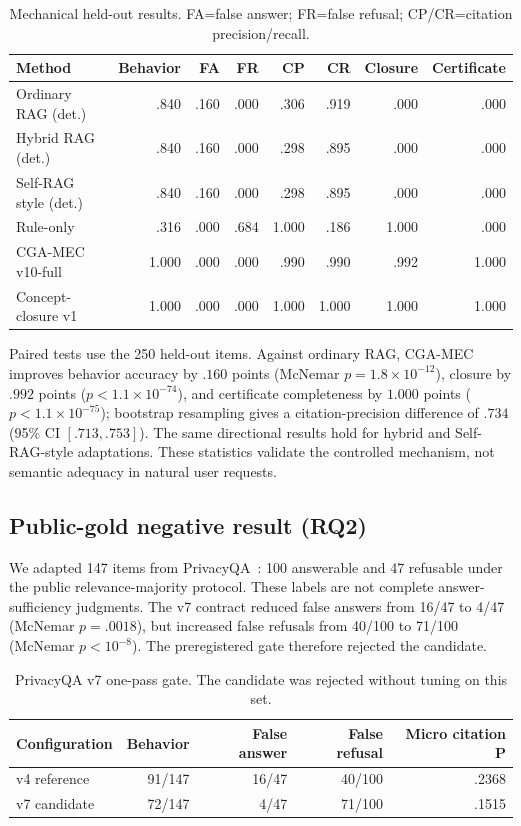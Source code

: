\documentclass[11pt]{article}
\newcommand{\method}{CGA-MEC}
\begin{document}
\begin{table}[t]
\centering
\caption{Mechanical held-out results. FA=false answer; FR=false refusal; CP/CR=citation precision/recall.}
\label{tab:mechanical}
\small
\begin{tabular}{@{}lrrrrrrr@{}}
\toprule
Method & Behavior & FA & FR & CP & CR & Closure & Certificate \\
\midrule
Ordinary RAG (det.) & .840 & .160 & .000 & .306 & .919 & .000 & .000 \\
Hybrid RAG (det.) & .840 & .160 & .000 & .298 & .895 & .000 & .000 \\
Self-RAG style (det.) & .840 & .160 & .000 & .298 & .895 & .000 & .000 \\
Rule-only & .316 & .000 & .684 & 1.000 & .186 & 1.000 & .000 \\
\method{} v10-full & 1.000 & .000 & .000 & .990 & .990 & .992 & 1.000 \\
Concept-closure v1 & 1.000 & .000 & .000 & 1.000 & 1.000 & 1.000 & 1.000 \\
\bottomrule
\end{tabular}
\end{table}

Paired tests use the 250 held-out items. Against ordinary RAG, \method{} improves behavior accuracy by $.160$ points (McNemar $p=1.8\times10^{-12}$), closure by $.992$ points ($p<1.1\times10^{-74}$), and certificate completeness by $1.000$ points ($p<1.1\times10^{-75}$); bootstrap resampling gives a citation-precision difference of $.734$ (95\% CI $[.713,.753]$). The same directional results hold for hybrid and Self-RAG-style adaptations. These statistics validate the controlled mechanism, not semantic adequacy in natural user requests.

\subsection{Public-gold negative result (RQ2)}

We adapted 147 items from PrivacyQA~\citep{ravichander2019privacyqa}: 100 answerable and 47 refusable under the public relevance-majority protocol. These labels are not complete answer-sufficiency judgments. The v7 contract reduced false answers from 16/47 to 4/47 (McNemar $p=.0018$), but increased false refusals from 40/100 to 71/100 (McNemar $p<10^{-8}$). The preregistered gate therefore rejected the candidate.

\begin{table}[t]
\centering
\caption{PrivacyQA v7 one-pass gate. The candidate was rejected without tuning on this set.}
\label{tab:privacyqa}
\small
\begin{tabular}{@{}lrrrr@{}}
\toprule
Configuration & Behavior & False answer & False refusal & Micro citation P \\
\midrule
v4 reference & 91/147 & 16/47 & 40/100 & .2368 \\
v7 candidate & 72/147 & 4/47 & 71/100 & .1515 \\
\bottomrule
\end{tabular}
\end{table}
\end{document}
